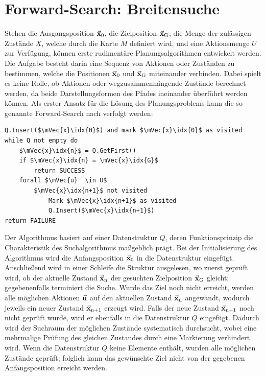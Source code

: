 \section{Forward-Search: Breitensuche}
Stehen die Ausgangsposition $\vec{\mathbf{x}}_{\text{0}}$, die Zielposition $\vec{\mathbf{x}}_{\text{G}}$, die Menge der zulässigen Zustände $X$, welche durch die Karte $M$ definiert wird, und eine Aktionsmenge $U$ zur Verfügung, können erste rudimentäre Planungsalgorithmen entwickelt werden. Die Aufgabe besteht darin eine Sequenz von Aktionen oder Zuständen zu bestimmen, welche die Positionen $\vec{\mathbf{x}}_{\text{0}}$ und $\vec{\mathbf{x}}_{\text{G}}$ miteinander verbinden. Dabei spielt es keine Rolle, ob Aktionen oder wegzusammenhängende Zustände berechnet werden, da beide Darstellungsformen des Pfades ineinander überführt werden können. Als erster Ansatz für die Lösung des Planungsproblems kann die so genannte Forward-Search nach \cite[S. 28]{PlanAlgo} verfolgt werden:
\begin{lstlisting}[mathescape=true, caption={Ablauf der Forward-Search in Pseudocode},captionpos=bot]
Q.Insert($\mVec{x}\idx{0}$) and mark $\mVec{x}\idx{0}$ as visited
while Q not empty do
	$\mVec{x}\idx{n}$ = Q.GetFirst()
	if $\mVec{x}\idx{n} = \mVec{x}\idx{G}$
		return SUCCESS
	forall $\mVec{u}  \in U$
		$\mVec{x}\idx{n+1}$ not visited
			Mark $\mVec{x}\idx{n+1}$ as visited
			Q.Insert($\mVec{x}\idx{n+1}$)
return FAILURE
\end{lstlisting}
Der Algorithmus basiert auf einer Datenstruktur $Q$, deren Funktionsprinzip die Charakteristik des Suchalgorithmus maßgeblich prägt. Bei der Initialisierung des Algorithmus wird die Anfangsposition $\vec{\mathbf{x}}_{\text{0}}$ in die Datenstruktur eingefügt. Anschließend wird in einer Schleife die Struktur ausgelesen, wo zuerst geprüft wird, ob der aktuelle Zustand $\vec{\mathbf{x}}_{\text{n}}$ der gesuchten Zielposition $\vec{\mathbf{x}}_{\text{G}}$ gleicht; gegebenenfalls terminiert die Suche. Wurde das Ziel noch nicht erreicht, werden alle möglichen Aktionen $\vec{\mathbf{u}}$ auf den aktuellen Zustand $\vec{\mathbf{x}}_{\text{n}}$ angewandt, wodurch jeweils ein neuer Zustand $\vec{\mathbf{x}}_{\text{n+1}}$ erzeugt wird. Falls der neue Zustand $\vec{\mathbf{x}}_{\text{n+1}}$ noch nicht geprüft wurde, wird er ebenfalls in die Datenstruktur $Q$ eingefügt. Dadurch wird der Suchraum der möglichen Zustände systematisch durchsucht, wobei eine mehrmalige Prüfung des gleichen Zustandes durch eine Markierung verhindert wird. Wenn die Datenstruktur $Q$ keine Elemente enthält, wurden alle möglichen Zustände geprüft; folglich kann das gewünschte Ziel nicht von der gegebenen Anfangsposition erreicht werden.


